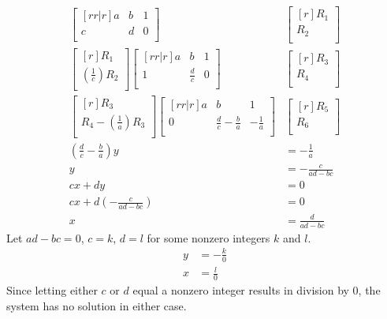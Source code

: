 \documentclass[12pt]{article}
\begin{document}
\begin{enumerate}
\begin{align*}
\begin{bmatrix}[rr|r]
a & b & 1\\
c & d & 0\\
\end{bmatrix}&
\begin{bmatrix}[r]
R_1\\ R_2\\
\end{bmatrix}\\
%
\begin{bmatrix}[r]
R_1\\
(\frac{1}{c})R_2\\
\end{bmatrix}
\begin{bmatrix}[rr|r]
a & b & 1\\
1 & \frac{d}{c} & 0\\
\end{bmatrix}&
\begin{bmatrix}[r]
R_3\\ R_4\\
\end{bmatrix}\\
%
\begin{bmatrix}[r]
R_3\\
R_4 - (\frac{1}{a})R_3\\
\end{bmatrix}
\begin{bmatrix}[rr|r]
a & b & 1\\
0 & \frac{d}{c} - \frac{b}{a} & -\frac{1}{a}\\
\end{bmatrix}&
\begin{bmatrix}[r]
R_5\\ R_6\\
\end{bmatrix}\\
%
(\frac{d}{c} - \frac{b}{a})y &= -\frac{1}{a}\\
y &= -\frac{c}{ad-bc}\\
cx+dy &= 0\\
cx+d(-\frac{c}{ad-bc}) &= 0\\
x &= \frac{d}{ad-bc}
\end{align*}
Let $ad-bc=0$, $c=k$, $d=l$ for some nonzero integers $k$ and $l$.
\begin{align*}
y &= -\frac{k}{0}\\
x &= \frac{l}{0}
\end{align*}
Since letting either $c$ or $d$ equal a nonzero integer results in division by 0, the system has no solution in either case.
\end{enumerate}
\end{document}

